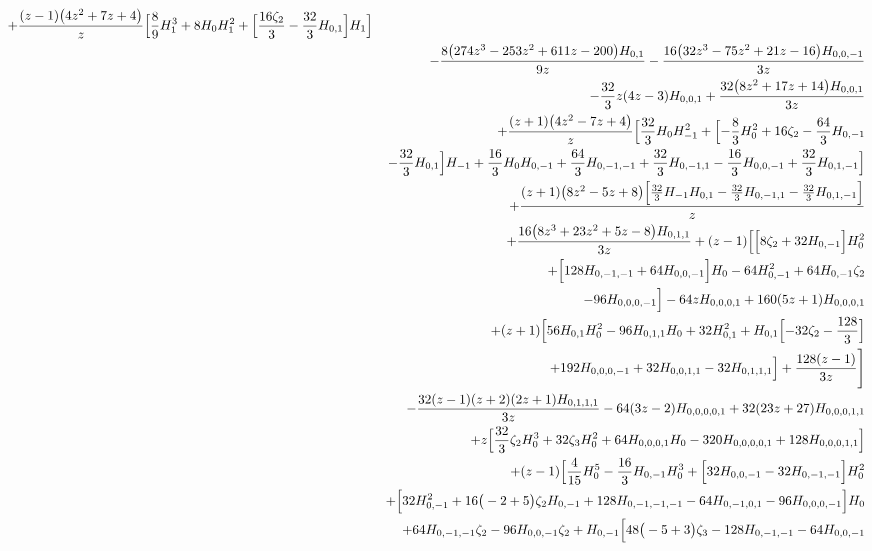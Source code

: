 \begin{eqnarray}
+\frac{(z-1) \big(4 z^2+7 z+4\big)}{z} \Bigl[\frac{8}{9} H_1^3+8 H_0
  H_1^2+\Bigl[\frac{16 \zeta_2}{3}-\frac{32}{3} H_{0,1}\Bigr] H_1\Bigr]
\nonumber\\&&
-\frac{8 \big(274 z^3-253 z^2+611 z-200\big) H_{0,1}}{9 z}-\frac{16 
  \big(32 z^3-75 z^2+21 z-16\big) H_{0,0,-1}}{3 z}
\nonumber\\&&
-\frac{32}{3}  z (4 z-3) H_{0,0,1}+\frac{32 \big(8 z^2+17 z+14\big)
  H_{0,0,1}}{3 z}
\nonumber\\&&
+\frac{(z+1) \big(4 z^2-7 z+4\big) }{z}
\Bigl[\frac{32}{3} H_0  H_{-1}^2
+\Bigl[-\frac{8}{3} H_0^2+16 \zeta_2-\frac{64}{3} H_{0,-1}
\nonumber\\&&
-\frac{32}{3} H_{0,1}\Bigr] H_{-1}+\frac{16}{3}
  H_0 H_{0,-1}+\frac{64}{3} H_{0,-1,-1}
+\frac{32}{3}  H_{0,-1,1}-\frac{16}{3} H_{0,0,-1}+\frac{32}{3} H_{0,1,-1}\Bigr]
\nonumber\\&&
+\frac{(z+1) \big(8 z^2-5 z+8\big) \Bigl[\frac{32}{3}  H_{-1}
  H_{0,1}-\frac{32}{3}  H_{0,-1,1}-\frac{32}{3} 
  H_{0,1,-1}\Bigr]}{z}
\nonumber\\&&
+\frac{16 \big(8 z^3+23 z^2+5 z-8\big) H_{0,1,1}}{3 z}+(z-1)
\Bigl[\Bigl[8 \zeta_2+32 H_{0,-1}\Bigr]
H_0^2
\nonumber\\&&
+\Bigl[128 H_{0,-1,-1}+64 H_{0,0,-1}\Bigr] H_0-64 H_{0,-1}^2+64 H_{0,-1} \zeta_2
\nonumber\\&&
-96 H_{0,0,0,-1}\Bigr]-64  z
H_{0,0,0,1}+160 (5 z+1) H_{0,0,0,1}
\nonumber\\&&
+(z+1) \Bigl[56 H_{0,1} H_0^2-96 H_{0,1,1} H_0+32 H_{0,1}^2+H_{0,1} \Bigl[-32
\zeta_2-\frac{128 }{3}\Bigr]
\nonumber\\&&
+192  H_{0,0,0,-1}+32 H_{0,0,1,1}-32 H_{0,1,1,1}\Bigr]+\frac{128 
  (z-1)}{3 z}\Biggr]
\nonumber \\ &&
-\frac{32 (z-1) (z+2) (2 z+1) H_{0,1,1,1}}{3 z}
-64 (3 z-2) H_{0,0,0,0,1}+32 (23 z+27) H_{0,0,0,1,1}
\nonumber\\&&
+z \Bigl[\frac{32}{3}  \zeta_2 H_0^3+32  \zeta_3 H_0^2
+64  H_{0,0,0,1} H_0-320  H_{0,0,0,0,1}+128  H_{0,0,0,1,1}\Bigr]
\nonumber\\&&
+(z-1) \Bigl[\frac{4}{15} H_0^5-\frac{16}{3} H_{0,-1} H_0^3
+\Bigl[32 H_{0,0,-1}-32 H_{0,-1,-1}\Bigr] H_0^2
\nonumber\\&&
+\Bigl[32 H_{0,-1}^2
+16 \big(-2+5
\big) \zeta_2 H_{0,-1}
+128 H_{0,-1,-1,-1}
-64  H_{0,-1,0,1}-96 H_{0,0,0,-1}\Bigr] H_0
\nonumber\\&&
+64
H_{0,-1,-1} \zeta_2
-96 H_{0,0,-1} \zeta_2+H_{0,-1} \Bigl[48 \big(-5+3
\big) \zeta_3
-128 H_{0,-1,-1}-64 H_{0,0,-1}

\end{eqnarray}
